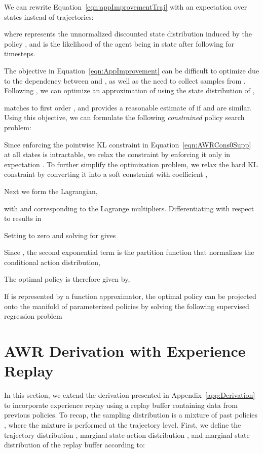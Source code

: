 \documentclass{article} \usepackage{iclr2020_conference,times}
\begin{document}
We can rewrite Equation~\ref{eqn:appImprovementTraj} with an expectation over states instead of trajectories:

where  represents the unnormalized discounted state distribution induced by the policy  \citep{Sutton1998}, and  is the likelihood of the agent being in state  after following  for  timesteps.

The objective in Equation~\ref{eqn:AppImprovement} can be difficult to optimize due to the dependency between  and , as well as the need to collect samples from . Following \citet{TRPOschulman15}, we can optimize an approximation  of  using the state distribution of ,

 matches  to first order \citep{Kakade2002}, and provides a reasonable estimate of  if  and  are similar.
Using this objective, we can formulate the following \emph{constrained} policy search problem:

Since enforcing the pointwise KL constraint in Equation~\ref{eqn:AWRCons0Supp} at all states is intractable, we relax the constraint by enforcing it only in expectation . To further simplify the optimization problem, we relax the hard KL constraint by converting it into a soft constraint with coefficient ,

Next we form the Lagrangian,

with  and  corresponding to the Lagrange multipliers. Differentiating  with respect to  results in

Setting to zero and solving for  gives


Since , the second exponential term is the partition function  that normalizes the conditional action distribution,

The optimal policy is therefore given by,


If  is represented by a function approximator, the optimal policy  can be projected onto the manifold of parameterized policies by solving the following supervised regression problem


\section{AWR Derivation with Experience Replay}
\label{app:ReplayDerivation}
In this section, we extend the derivation presented in Appendix~\ref{app:Derivation} to incorporate experience replay using a replay buffer containing data from previous policies. To recap, the sampling distribution is a mixture of  past policies , where the mixture is performed at the trajectory level. First, we define the trajectory distribution , marginal state-action distribution , and marginal state distribution  of the replay buffer according to:
\end{document}
